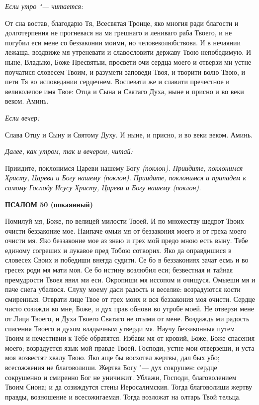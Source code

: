 \medskip


\itshape Если утро "--- читается: \normalfont{}


От сна востав, благодарю Тя, Всесвятая Троице, яко многия ради благости и долготерпения не прогневася на мя грешнаго и лениваго раба Твоего, и не погубил еси мене со беззаконии моими, но человеколюбствова. И в нечаянии лежаща, воздвиже мя утреневати и славословити державу Твою непобедимую. И ныне, Владыко, Боже Пресвятыи, просвети очи сердца моего и отверзи ми устне поучатися словесем Твоим, и разумети заповеди Твоя, и творити волю Твою, и пети Тя во исповедании сердечнем. Воспевати же и славити пречестное и великолепое имя Твое: Отца и Сына и Святаго Духа, ныне и присно и во веки веком. Аминь.


\medskip


\itshape Если вечер:\normalfont{}


Слава Отцу и Сыну и Святому Духу. И ныне, и присно, и во веки веком. Аминь.


\medskip


\itshape Далее, как утром, так и вечером, читай:\normalfont{}


Приидите, поклонимся Цареви нашему Богу \itshape (поклон)\normalfont{}. Приидите, поклонимся Христу, Цареви и Богу нашему \itshape (поклон)\normalfont{}. Приидите, поклонимся и припадем к самому Господу Исусу Христу, Цареви и Богу нашему \itshape (поклон)\normalfont{}. 


\medskip


\bfseries ПСАЛОМ 50 (покаянный)\normalfont{}\nopagebreak


Помилуй мя, Боже, по велицей милости Твоей. И по множеству щедрот Твоих очисти беззаконие мое. Наипаче омыи мя от беззакония моего и от греха моего очисти мя. Яко беззаконие мое аз знаю и грех мой предо мною есть выну. Тебе единому согреших и лукавое пред Тобою сотворих. Яко да оправдишися в словесех Своих и победиши внегда судити. Се бо в беззакониях зачат есмь и во гресех роди мя мати моя. Се бо истину возлюбил еси; безвестная и тайная премудрости Твоея явил ми еси. Окропиши мя иссопом и очищуся. Омыеши мя и паче снега убелюся. Слуху моему даси радость и веселие: возрадуются кости смиренныя. Отврати лице Твое от грех моих и вся беззакония моя очисти. Сердце чисто созижди во мне, Боже, и дух прав обнови во утробе моей. Не отверзи мене от Лица Твоего, и Духа Твоего Святаго не отыми от мене. Воздаждь ми радость спасения Твоего и духом владычным утверди мя. Научу беззаконныя путем Твоим и нечестивии к Тебе обратятся. Избави мя от кровий, Боже, Боже спасения моего; возрадуется язык мой правде Твоей. Господи, устне мои отверзеши, и уста моя возвестят хвалу Твою. Яко аще бы восхотел жертвы, дал бых убо; всесожжения не благоволиши. Жертва Богу "--- дух сокрушен: сердце сокрушенно и смиренно Бог не уничижит. Ублажи, Господи, благоволением Твоим Сиона; и да созиждутся стены Иеросалимския. Тогда благоволиши жертву правды, возношение и всесожигаемая. Тогда возложат на олтарь Твой тельца. 


